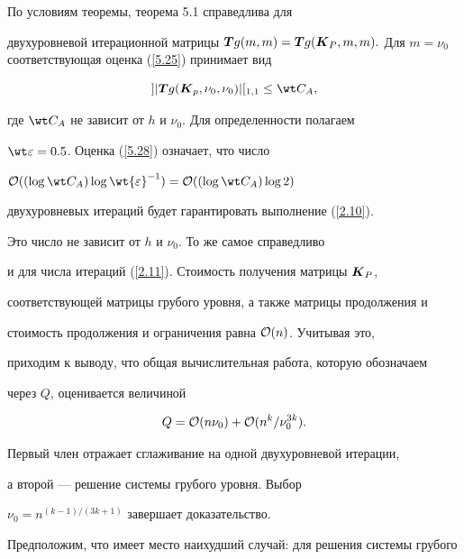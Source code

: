 \begin{pf}


По условиям теоремы, теорема 5.1 справедлива для


двухуровневой итерационной матрицы ${\bi T}g(m,m)={\bi Tg}({\bi K}_P,m,m).


$ Для $m=\nu_0$ соответствующая оценка (\ref{5.25}) принимает вид


\begin{equation}\label{5.28}


]|{\bi T}g({\bi K}_p,\nu_0,\nu_0)|[{_{1,1}}\le \wt C_A,


\end{equation}


где $\wt C_A$ не зависит от $h$ и $\nu_0$. Для определенности полагаем


$\wt\varepsilon=0.5$. Оценка (\ref{5.28}) означает, что число


${\cal O}((\log{\wt C_A})\log\wt{\varepsilon}^{-1})=


{\cal O}((\log\wt C_A)\log2)$


двухуровневых итераций будет гарантировать выполнение (\ref{2.10}).


Это число не зависит от $h$ и $\nu_0$. То же самое справедливо


и для числа итераций (\ref{2.11}). Стоимость получения матрицы ${\boldsymbol K}_P$,


соответствующей матрицы грубого уровня, а также матрицы продолжения и


стоимость продолжения и ограничения равна ${\cal O}(n)$. Учитывая это,


приходим к выводу, что общая вычислительная работа, которую обозначаем


через $Q$, оценивается величиной


$$


Q= {\cal O}(n\nu_0)+{\cal O}(n^k/\nu^{3k}_0).


$$


Первый член отражает сглаживание на одной двухуровневой итерации,


а второй --- решение системы грубого уровня. Выбор


$\nu_0=n^{(k-1)/(3k+1)}$ завершает доказательство.


\end{pf}





Предположим, что имеет место наихудший случай: для решения системы грубого


